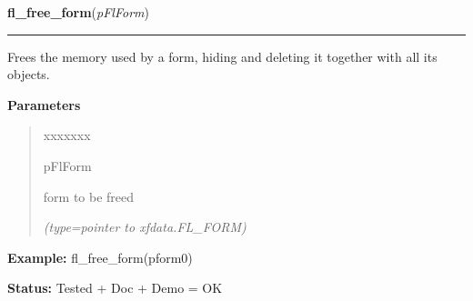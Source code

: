     \label{xformslib:flbasic:fl_free_form}

    \vspace{0.5ex}

\hspace{.8\funcindent}\begin{boxedminipage}{\funcwidth}

    \raggedright \textbf{fl\_free\_form}(\textit{pFlForm})

    \vspace{-1.5ex}

    \rule{\textwidth}{0.5\fboxrule}
\setlength{\parskip}{2ex}
    Frees the memory used by a form, hiding and deleting it together with 
    all its objects.

\setlength{\parskip}{1ex}
      \textbf{Parameters}
      \vspace{-1ex}

      \begin{quote}
        \begin{Ventry}{xxxxxxx}

          \item[pFlForm]

          form to be freed

            {\it (type=pointer to xfdata.FL\_FORM)}

        \end{Ventry}

      \end{quote}

\textbf{Example:} fl\_free\_form(pform0)



\textbf{Status:} Tested + Doc + Demo = OK



    \end{boxedminipage}

    \label{xformslib:flbasic:fl_redraw_form}

    \vspace{0.5ex}

